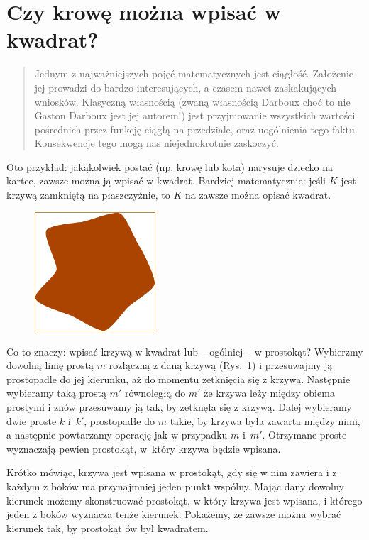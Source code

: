 \documentclass[a4paper,12pt]{article}
\begin{document}
\pagestyle{empty}

\section*{Czy krowę można wpisać w kwadrat?}

\begin{abstract}
Jednym z najważniejszych pojęć matematycznych jest ciągłość.
Założenie jej prowadzi do bardzo interesujących,
a czasem nawet zaskakujących wniosków.
Klasyczną własnością (zwaną własnością Darboux choć to
nie Gaston Darboux jest jej autorem!)
jest przyjmowanie wszystkich wartości pośrednich przez
funkcję ciągłą na przedziale, oraz uogólnienia tego faktu.
Konsekwencje tego mogą nas niejednokrotnie zaskoczyć.
\end{abstract}

Oto przykład: jakąkolwiek postać (np. krowę lub kota)
narysuje dziecko na kartce, zawsze można ją wpisać w kwadrat.
Bardziej matematycznie: jeśli $K$ jest krzywą zamkniętą 
na płaszczyźnie, to $K$ na zawsze można opisać kwadrat.

\begin{figure}
\includegraphics[width=4.5cm]{kleks-1}
\vspace{-14pt}
\label{krowa}
\end{figure}

Co to znaczy: wpisać krzywą w kwadrat lub – ogólniej – w prostokąt?
Wybierzmy dowolną linię prostą $m$ rozłączną z daną krzywą (Rys.~\ref{krowa}) 
i przesuwajmy ją prostopadle do jej kierunku,
aż do momentu zetknięcia się z krzywą.
Następnie wybieramy taką prostą $m'$ równoległą do $m'$   
że krzywa leży między obiema prostymi i znów przesuwamy ją tak,
by zetknęła się z krzywą. Dalej wybieramy dwie proste $k$
i~$k'$, prostopadłe do $m$ takie, by krzywa była zawarta między nimi,
a następnie powtarzamy operację jak w przypadku
$m$ i~$m'$. Otrzymane proste wyznaczają pewien prostokąt, 
w~który krzywa będzie wpisana.

Krótko mówiąc, krzywa jest wpisana w prostokąt,
gdy się w nim zawiera i z każdym z boków ma przynajmniej
jeden punkt wspólny. Mając dany dowolny kierunek
możemy skonstruować prostokąt, w który krzywa
jest wpisana, i którego jeden z boków wyznacza 
tenże kierunek. Pokażemy, że zawsze można wybrać
kierunek tak, by prostokąt ów był kwadratem. 
\end{document}
